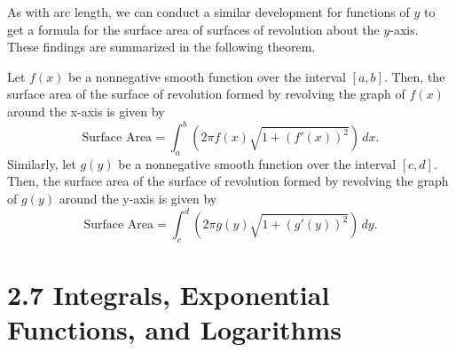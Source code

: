 \documentclass{report}
\begin{document}
        As with arc length, we can conduct a similar development for functions of \(y\) to get a formula for the surface area of surfaces of revolution about the \(y\)-axis. These findings are summarized in the following theorem.
        \bigbreak \noindent 
        \begin{thrm}
           Let \( f(x) \) be a nonnegative smooth function over the interval \([a,b]\).
Then, the surface area of the surface of revolution formed by revolving the graph of \( f(x) \)
around the x-axis is given by
\[
\text{Surface Area} = \int_{a}^{b} \left( 2\pi f(x) \sqrt{1 + \left( f'(x) \right)^2} \right) \, dx.
\]
Similarly, let \( g(y) \) be a nonnegative smooth function over the interval \([c,d]\).
Then, the surface area of the surface of revolution formed by revolving the graph of \( g(y) \)
around the y-axis is given by
\[
\text{Surface Area} = \int_{c}^{d} \left( 2\pi g(y) \sqrt{1 + \left( g'(y) \right)^2} \right) \, dy.
\] 
        \end{thrm}

        \pagebreak 
        \section*{2.7 Integrals, Exponential Functions, and Logarithms}
        \bigbreak \noindent 

\end{document}
